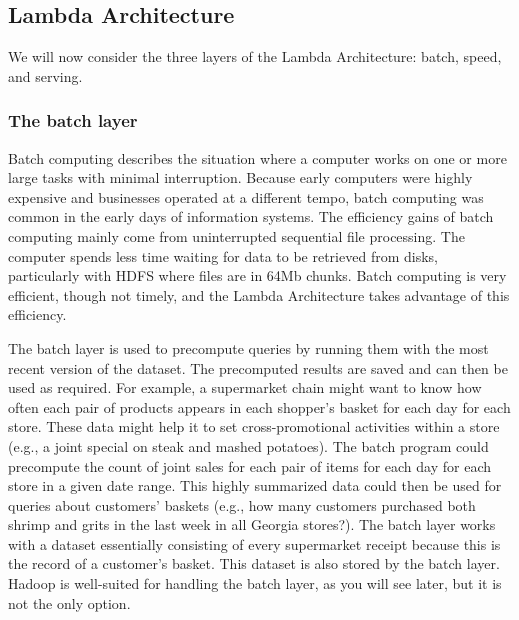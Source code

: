 \documentclass[
]{article}
\begin{document}
\hypertarget{lambda-architecture}{%
\subsection*{Lambda Architecture}\label{lambda-architecture}}

We will now consider the three layers of the Lambda Architecture: batch,
speed, and serving.

\hypertarget{the-batch-layer}{%
\subsubsection*{The batch layer}\label{the-batch-layer}}

Batch computing describes the situation where a computer works on one or
more large tasks with minimal interruption. Because early computers were
highly expensive and businesses operated at a different tempo, batch
computing was common in the early days of information systems. The
efficiency gains of batch computing mainly come from uninterrupted
sequential file processing. The computer spends less time waiting for
data to be retrieved from disks, particularly with HDFS where files are
in 64Mb chunks. Batch computing is very efficient, though not timely,
and the Lambda Architecture takes advantage of this efficiency.

The batch layer is used to precompute queries by running them with the
most recent version of the dataset. The precomputed results are saved
and can then be used as required. For example, a supermarket chain might
want to know how often each pair of products appears in each shopper's
basket for each day for each store. These data might help it to set
cross-promotional activities within a store (e.g., a joint special on
steak and mashed potatoes). The batch program could precompute the count
of joint sales for each pair of items for each day for each store in a
given date range. This highly summarized data could then be used for
queries about customers' baskets (e.g., how many customers purchased
both shrimp and grits in the last week in all Georgia stores?). The
batch layer works with a dataset essentially consisting of every
supermarket receipt because this is the record of a customer's basket.
This dataset is also stored by the batch layer. Hadoop is well-suited
for handling the batch layer, as you will see later, but it is not the
only option.
\end{document}
